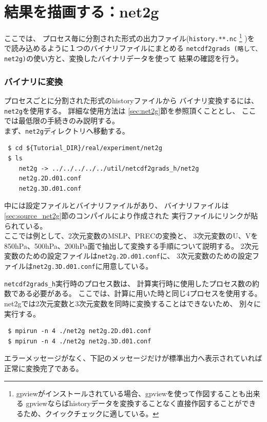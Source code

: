 \section{結果を描画する：net2g} \label{sec:quicklook}

ここでは、
プロセス毎に分割された{\netcdf}形式の出力ファイル(\verb|history.**.nc|
\footnote{gpviewがインストールされている場合、gpviewを使って作図することも出来る
gpviewならばhistoryデータを変換することなく直接作図することができるため、クイックチェックに適している。}
)を
{\grads}で読み込めるように１つのバイナリファイルにまとめる
\verb|netcdf2grads (略して、net2g)|の使い方と、変換した{\grads}バイナリデータを使って
結果の確認を行う。


\subsubsection{{\grads}バイナリに変換}
プロセスごとに分割された{\netcdf}形式のhistoryファイルから
{\grads}バイナリ変換するには、\verb|net2g|を使用する。
詳細な使用方法は \ref{sec:net2g}節を参照頂くこととし、
ここでは最低限の手続きのみ説明する。\\

まず、\verb|net2g|ディレクトリへ移動する。
\begin{verbatim}
 $ cd ${Tutorial_DIR}/real/experiment/net2g
 $ ls
    net2g -> ../../../../../util/netcdf2grads_h/net2g
    net2g.2D.d01.conf
    net2g.3D.d01.conf
\end{verbatim}
中には設定ファイルとバイナリファイルがあり、
バイナリファイルは\ref{sec:source_net2g}節のコンパイルにより作成された
実行ファイルにリンクが貼られている。\\

ここでは例として、2次元変数のMSLP、PRECの変換と、
3次元変数のU、Vを850hPa、500hPa、200hPa面で抽出して変換する手順について説明する。
2次元変数のための設定ファイルは\verb|net2g.2D.d01.conf|に、
3次元変数のための設定ファイルは\verb|net2g.3D.d01.conf|に用意している。

\verb|netcdf2grads_h|実行時のプロセス数は、
計算実行時に使用したプロセス数の約数である必要がある。
ここでは、計算に用いた時と同じ4プロセスを使用する。
net2gでは2次元変数と3次元変数を同時に変換することはできないため、
別々に実行する。
\begin{verbatim}
 $ mpirun -n 4 ./net2g net2g.2D.d01.conf
 $ mpirun -n 4 ./net2g net2g.3D.d01.conf
\end{verbatim}
エラーメッセージがなく、下記のメッセージだけが標準出力へ表示されていれば正常に変換完了である。\\

